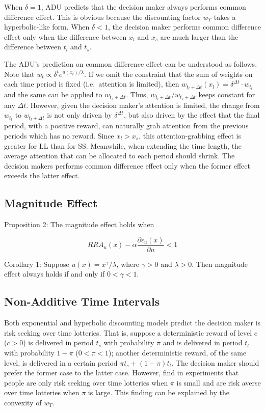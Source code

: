 \documentclass[
  12pt,
]{article}
\begin{document}
When \(\delta = 1\), ADU predicts that the decision maker always
performs common difference effect. This is obvious because the
discounting factor \(w_T\) takes a hyperbolic-like form. When
\(\delta<1\), the decision maker performs common difference effect only
when the difference between \(x_l\) and \(x_s\) are much larger than the
difference between \(t_l\) and \(t_s\).

The ADU's prediction on common difference effect can be understood as
follows. Note that \(w_t \propto \delta^t e^{u(x_t)/\lambda}\). If we
omit the constraint that the sum of weights on each time period is fixed
(i.e.~attention is limited), then
\(w_{t_l+\Delta t}(x_l) = \delta^{\Delta t} \cdot w_{t_l}\) and the same
can be applied to \(w_{t_s+\Delta t}\). Thus,
\(w_{t_l+\Delta t} / w_{t_s+\Delta t}\) keeps constant for any
\(\Delta t\). However, given the decision maker's attention is limited,
the change from \(w_{t_l}\) to \(w_{t_l+\Delta t}\) is not only driven
by \(\delta^{\Delta t}\), but also driven by the effect that the final
period, with a positive reward, can naturally grab attention from the
previous periods which has no reward. Since \(x_l > x_s\), this
attention-grabbing effect is greater for LL than for SS. Meanwhile, when
extending the time length, the average attention that can be allocated
to each period should shrink. The decision makers performs common
difference effect only when the former effect exceeds the latter effect.

\hypertarget{magnitude-effect}{%
\subsection{Magnitude Effect}\label{magnitude-effect}}

Proposition 2: The magnitude effect holds when

\[
RRA_u(x)-\alpha\frac{\partial \epsilon_u (x)}{\partial u} <1
\]

Corollary 1: Suppose \(u(x)=x^\gamma/\lambda\), where \(\gamma>0\) and
\(\lambda>0\). Then magnitude effect always holds if and only if
\(0<\gamma<1\).

\hypertarget{non-additive-time-intervals}{%
\subsection{Non-Additive Time
Intervals}\label{non-additive-time-intervals}}

Both exponential and hyperbolic discounting models predict the decision
maker is risk seeking over time lotteries. That is, suppose a
deterministic reward of level \(c\) (\(c>0\)) is delivered in period
\(t_s\) with probability \(\pi\) and is delivered in period \(t_l\) with
probability \(1-\pi\) (\(0<\pi<1\)); another deterministic reward, of
the same level, is delivered in a certain period
\(\pi t_s +(1-\pi) t_l\). The decision maker should prefer the former
case to the latter case. However, \citet{onay_intertemporal_2007} find
in experiments that people are only risk seeking over time lotteries
when \(\pi\) is small and are risk averse over time lotteries when
\(\pi\) is large. This finding can be explained by the convexity of
\(w_T\).
\end{document}
